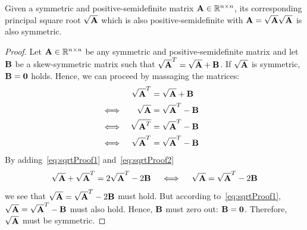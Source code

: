 		\begin{lemma}
			Given a symmetric and positive-semidefinite matrix \( \boldsymbol{\mathrm{A}} \in \mathbb{R}^{n \times n} \), its corresponding principal square root \( \sqrt{\boldsymbol{\mathrm{A}}} \) which is also positive-semidefinite with \( \boldsymbol{\mathrm{A}} = \sqrt{\boldsymbol{\mathrm{A}}} \sqrt{\boldsymbol{\mathrm{A}}} \) is also symmetric.
		\end{lemma}
		\begin{proof}
			Let \( \boldsymbol{\mathrm{A}} \in \mathbb{R}^{n \times n} \) be any symmetric and positive-semidefinite matrix and let \( \boldsymbol{\mathrm{B}} \) be a skew-symmetric matrix such that \( \sqrt{\boldsymbol{\mathrm{A}}}^T = \sqrt{\boldsymbol{\mathrm{A}}} + \boldsymbol{\mathrm{B}} \). If \( \sqrt{\boldsymbol{\mathrm{A}}} \) is symmetric, \( \boldsymbol{\mathrm{B}} = \boldsymbol{\mathrm{0}} \) holds. Hence, we can proceed by massaging the matrices:
			\begin{align}
				     && \sqrt{\boldsymbol{\mathrm{A}}}^T &= \sqrt{\boldsymbol{\mathrm{A}}} + \boldsymbol{\mathrm{B}} &  \nonumber \\
				\iff && \sqrt{\boldsymbol{\mathrm{A}}}   &= \sqrt{\boldsymbol{\mathrm{A}}}^T - \boldsymbol{\mathrm{B}} &  \label{eq:sqrtProof1} \\
				\iff && \sqrt{\boldsymbol{\mathrm{A}}^T} &= \sqrt{\boldsymbol{\mathrm{A}}}^T - \boldsymbol{\mathrm{B}} &  \nonumber \\
				\iff && \sqrt{\boldsymbol{\mathrm{A}}}^T &= \sqrt{\boldsymbol{\mathrm{A}}}^T - \boldsymbol{\mathrm{B}} &  \label{eq:sqrtProof2}
			\end{align}
			By adding~\eqref{eq:sqrtProof1} and~\eqref{eq:sqrtProof2}
			\begin{align*}
				\sqrt{\boldsymbol{\mathrm{A}}} + \sqrt{\boldsymbol{\mathrm{A}}}^T = 2 \sqrt{\boldsymbol{\mathrm{A}}}^T - 2 \boldsymbol{\mathrm{B}} \quad\iff\quad \sqrt{\boldsymbol{\mathrm{A}}} = \sqrt{\boldsymbol{\mathrm{A}}}^T - 2 \boldsymbol{\mathrm{B}}
			\end{align*}
			we see that \( \sqrt{\boldsymbol{\mathrm{A}}} = \sqrt{\boldsymbol{\mathrm{A}}}^T - 2 \boldsymbol{\mathrm{B}} \) must hold. But according to~\eqref{eq:sqrtProof1}, \( \sqrt{\boldsymbol{\mathrm{A}}} = \sqrt{\boldsymbol{\mathrm{A}}}^T - \boldsymbol{\mathrm{B}} \) must also hold. Hence, \( \boldsymbol{\mathrm{B}} \) must zero out: \( \boldsymbol{\mathrm{B}} = \boldsymbol{\mathrm{0}} \). Therefore, \( \sqrt{\boldsymbol{\mathrm{A}}} \) must be symmetric.
			
			\qedhere
		\end{proof}













